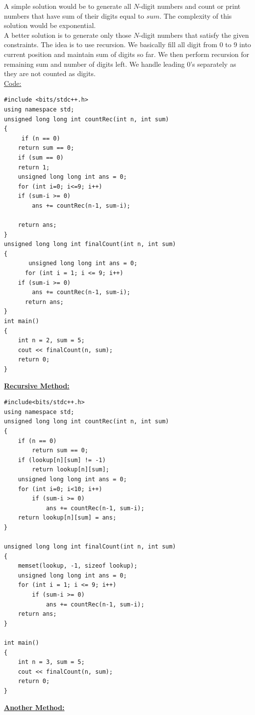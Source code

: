 \documentclass[12pt]{book}
\begin{document}
A simple solution would be to generate all $N$-digit numbers and count or print numbers that have sum of their digits equal to $sum$. The complexity of this solution would be exponential.\\

A better solution is to generate only those $N$-digit numbers that satisfy the given constraints. The idea is to use recursion. We basically fill all digit from 0 to 9 into current position and maintain sum of digits so far. We then perform recursion for remaining sum and number of digits left. We handle leading 0’s separately as they are not counted as digits.\\

\underline{Code:}\\
\begin{lstlisting}
#include <bits/stdc++.h>
using namespace std;
unsigned long long int countRec(int n, int sum)
{
     if (n == 0)
    return sum == 0;
    if (sum == 0)
    return 1;
    unsigned long long int ans = 0;
    for (int i=0; i<=9; i++)
    if (sum-i >= 0)
        ans += countRec(n-1, sum-i);
  
    return ans;
}
unsigned long long int finalCount(int n, int sum)
{
       unsigned long long int ans = 0;
      for (int i = 1; i <= 9; i++)
    if (sum-i >= 0)
        ans += countRec(n-1, sum-i);
      return ans;
}
int main()
{
    int n = 2, sum = 5;
    cout << finalCount(n, sum);
    return 0;
}
\end{lstlisting}


\textbf{\underline{Recursive Method:}}\\
\begin{lstlisting}
#include<bits/stdc++.h>
using namespace std;
unsigned long long int countRec(int n, int sum)
{
    if (n == 0)
        return sum == 0;
    if (lookup[n][sum] != -1)
        return lookup[n][sum];
    unsigned long long int ans = 0;
    for (int i=0; i<10; i++)
        if (sum-i >= 0)
            ans += countRec(n-1, sum-i);
    return lookup[n][sum] = ans;
}

unsigned long long int finalCount(int n, int sum)
{
    memset(lookup, -1, sizeof lookup);
    unsigned long long int ans = 0;
    for (int i = 1; i <= 9; i++)
        if (sum-i >= 0)
            ans += countRec(n-1, sum-i);
    return ans;
}

int main()
{
    int n = 3, sum = 5;
    cout << finalCount(n, sum);
    return 0;
}
\end{lstlisting}


\textbf{\underline{Another Method:}}\\
\end{document}
